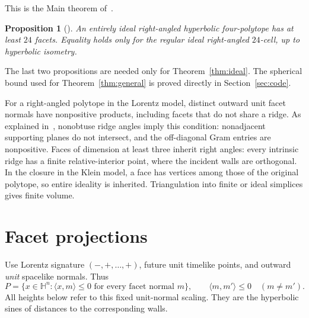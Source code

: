 \documentclass[11pt]{article}
\newtheorem{proposition}[theorem]{Proposition}
\theoremstyle{remark}
\newcommand{\HH}{\mathbb H}
\newcommand{\ip}[2]{\langle #1,#2\rangle}
\begin{document}
This is the Main theorem of~\cite[p.~4]{Musin}.

\begin{proposition}[{\cite[Theorem~4]{Kolpakov}}]\label{prop:24}
An entirely ideal right-angled hyperbolic four-polytope has at least
$24$ facets. Equality holds only for the regular ideal right-angled
$24$-cell, up to hyperbolic isometry.
\end{proposition}

The last two propositions are needed only for Theorem~\ref{thm:ideal}.
The spherical bound used for Theorem~\ref{thm:general} is proved
directly in Section~\ref{sec:code}.

For a right-angled polytope in the Lorentz model, distinct outward unit facet normals have
nonpositive products, including facets that do not share a ridge.
As explained in~\cite[p.~42, \S2.1]{Vinberg}, nonobtuse ridge
angles imply this condition: nonadjacent supporting planes
do not intersect, and the off-diagonal Gram entries are nonpositive.
Faces of dimension at least three inherit right angles: every
intrinsic ridge has a finite relative-interior point, where the
incident walls are orthogonal. In the closure in the Klein model, a face has
vertices among those of the original polytope, so entire ideality is
inherited. Triangulation into finite or ideal simplices gives finite
volume.

\section{Facet projections}\label{sec:descent}

Use Lorentz signature $(-,+,\ldots,+)$, future unit timelike points,
and outward \emph{unit} spacelike normals. Thus
\[
 P=\{x\in\HH^n:\ip{x}{m}\le0\text{ for every facet normal }m\},
 \qquad \ip{m}{m'}\le0\quad(m\ne m').
\]
All heights below refer to this fixed unit-normal scaling. They are
the hyperbolic sines of distances to the corresponding walls.
\end{document}
